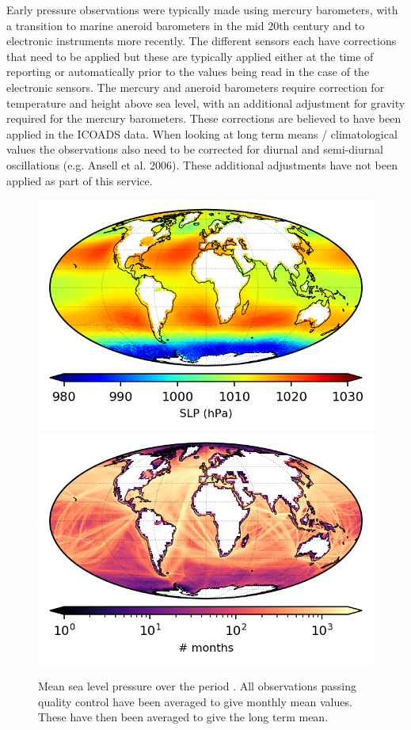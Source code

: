 Early pressure observations were typically made using mercury barometers, with a transition to marine aneroid barometers in the mid 20th century and to electronic instruments more recently. 
The different sensors each have corrections that need to be applied but these are typically applied either at the time of reporting or automatically prior to the values being read in the case of the electronic sensors. 
The mercury and aneroid barometers require correction for temperature and height above sea level, with an additional adjustment for gravity required for the mercury barometers. 
These corrections are believed to have been applied in the ICOADS data.
When looking at long term means / climatological values the observations also need to be corrected for diurnal and semi-diurnal oscillations (e.g. Ansell et al. 2006). These additional adjustments have not been applied as part of this service.



\begin{figure}[h]
    \includegraphics{resources/observations-slp-mean-map-optimal.png}
    \includegraphics{resources/observations-slp-months-map-optimal.png}    
    \caption{Mean sea level pressure over the period \datatimerange{}. All observations passing quality control have been averaged to give monthly mean values. These have then been averaged to give the long term mean.\\}
    \label{fig:slp-map}
\end{figure}
\FloatBarrier
